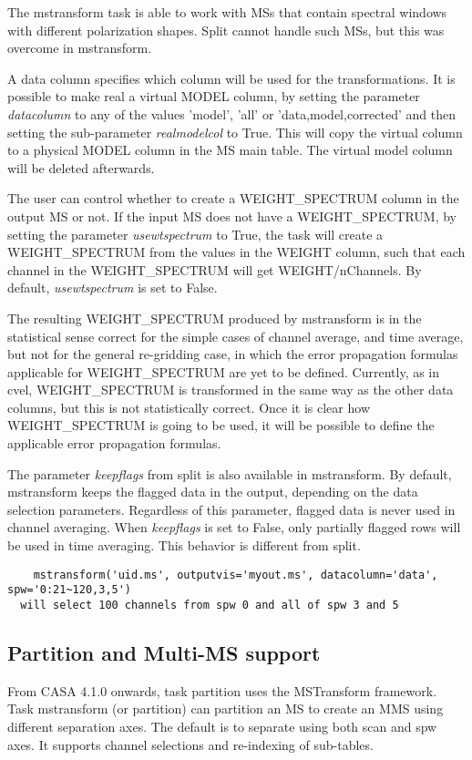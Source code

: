 The mstransform task is able to work with MSs that contain spectral windows with 
different polarization shapes. Split cannot handle such MSs, but this was overcome 
in mstransform.

A data column specifies which column will be used for the transformations. It is
possible to make real a virtual MODEL column, by setting the parameter
{\it datacolumn} to any of the values 'model', 'all' or 'data,model,corrected'
and then setting the sub-parameter {\it realmodelcol} to True. This will copy the virtual
column to a physical MODEL column in the MS main table. The virtual model column
will be deleted afterwards.

The user can control whether to create a WEIGHT_SPECTRUM column in the output MS or
not. If the input MS does not have a WEIGHT_SPECTRUM, by setting the parameter
{\it usewtspectrum} to True, the task will create a WEIGHT_SPECTRUM from the values
in the WEIGHT column, such that each channel in the WEIGHT_SPECTRUM will get WEIGHT/nChannels.
By default, {\it usewtspectrum} is set to False.

The resulting WEIGHT_SPECTRUM produced by mstransform is in the statistical sense 
correct for the simple cases of channel average, and time average, but not for the 
general re-gridding case, in which the error propagation formulas applicable for 
WEIGHT_SPECTRUM are yet to be defined. Currently, as in cvel, WEIGHT_SPECTRUM is 
transformed in the same way as the other data columns, but this is not statistically 
correct. Once it is clear how WEIGHT_SPECTRUM is going to be used, it will be possible 
to define the applicable error propagation formulas.

The parameter {\it keepflags} from split is also available in mstransform. By
default, mstransform keeps the flagged data in the output, depending on the data
selection parameters. Regardless of this parameter, flagged data is never used
in channel averaging. When {\it keepflags} is set to False, only partially
flagged rows will be used in time averaging. This behavior is different from
split.

\begin{verbatim}
    mstransform('uid.ms', outputvis='myout.ms', datacolumn='data', spw='0:21~120,3,5')
  will select 100 channels from spw 0 and all of spw 3 and 5
\end{verbatim}

\subsection{Partition and Multi-MS support}
From CASA 4.1.0 onwards, task partition uses the MSTransform framework.
Task mstransform (or partition) can partition an MS to create an MMS using
different separation axes. The default is to separate using both scan and spw axes.
It supports channel selections and re-indexing of sub-tables. 

